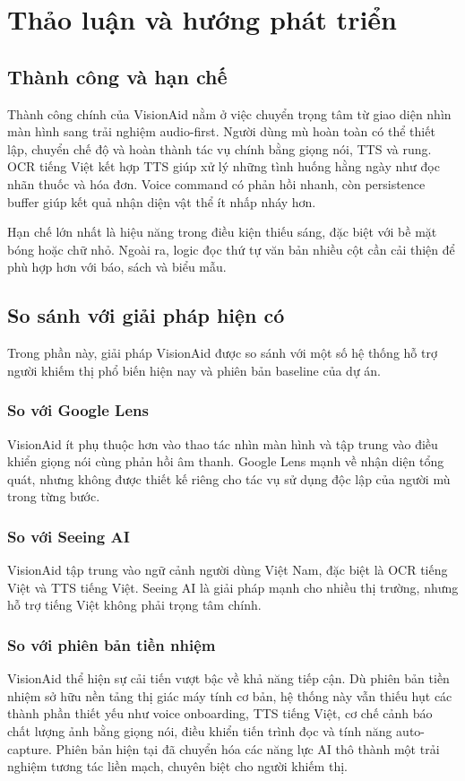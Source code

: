 \documentclass[a4paper,13pt]{report}
\begin{document}
\chapter{Thảo luận và hướng phát triển}

\section{Thành công và hạn chế}

Thành công chính của VisionAid nằm ở việc chuyển trọng tâm từ giao diện nhìn màn hình sang trải nghiệm audio-first. Người dùng mù hoàn toàn có thể thiết lập, chuyển chế độ và hoàn thành tác vụ chính bằng giọng nói, TTS và rung. OCR tiếng Việt kết hợp TTS giúp xử lý những tình huống hằng ngày như đọc nhãn thuốc và hóa đơn. Voice command có phản hồi nhanh, còn persistence buffer giúp kết quả nhận diện vật thể ít nhấp nháy hơn.

Hạn chế lớn nhất là hiệu năng trong điều kiện thiếu sáng, đặc biệt với bề mặt bóng hoặc chữ nhỏ. Ngoài ra, logic đọc thứ tự văn bản nhiều cột cần cải thiện để phù hợp hơn với báo, sách và biểu mẫu.

\section{So sánh với giải pháp hiện có}

Trong phần này, giải pháp VisionAid được so sánh với một số hệ thống hỗ trợ người khiếm thị phổ biến hiện nay và phiên bản baseline của dự án.

\subsection{So với Google Lens}
VisionAid ít phụ thuộc hơn vào thao tác nhìn màn hình và tập trung vào điều khiển giọng nói cùng phản hồi âm thanh. Google Lens mạnh về nhận diện tổng quát, nhưng không được thiết kế riêng cho tác vụ sử dụng độc lập của người mù trong từng bước.

\subsection{So với Seeing AI}
VisionAid tập trung vào ngữ cảnh người dùng Việt Nam, đặc biệt là OCR tiếng Việt và TTS tiếng Việt. Seeing AI là giải pháp mạnh cho nhiều thị trường, nhưng hỗ trợ tiếng Việt không phải trọng tâm chính.

\subsection{So với phiên bản tiền nhiệm}
VisionAid thể hiện sự cải tiến vượt bậc về khả năng tiếp cận. Dù phiên bản tiền nhiệm sở hữu nền tảng thị giác máy tính cơ bản, hệ thống này vẫn thiếu hụt các thành phần thiết yếu như voice onboarding, TTS tiếng Việt, cơ chế cảnh báo chất lượng ảnh bằng giọng nói, điều khiển tiến trình đọc và tính năng auto-capture. Phiên bản hiện tại đã chuyển hóa các năng lực AI thô thành một trải nghiệm tương tác liền mạch, chuyên biệt cho người khiếm thị.
\end{document}
